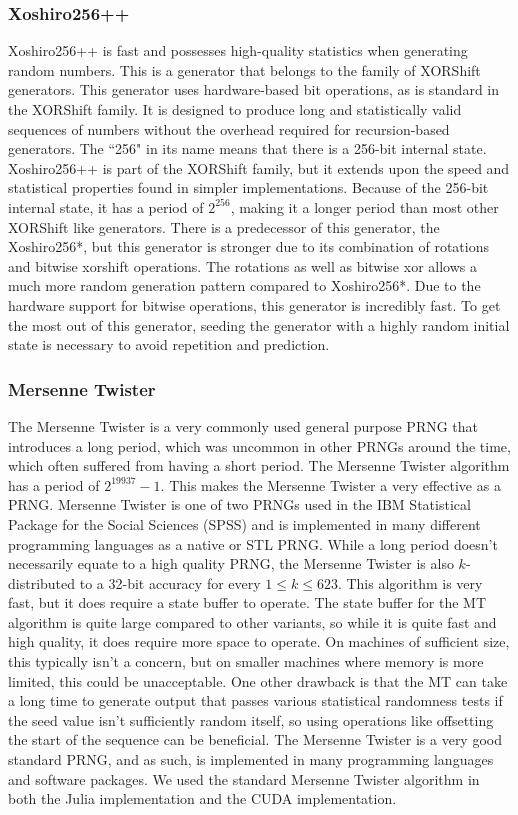 \documentclass{article}
\begin{document}
            \subsubsection{Xoshiro256++}
Xoshiro256++ is fast and possesses high-quality statistics when generating random numbers. This is a generator that belongs to the family of XORShift generators. This generator uses hardware-based bit operations, as is standard in the XORShift family. It is designed to produce long and statistically valid sequences of numbers without the overhead required for recursion-based generators. The ``256" in its name means that there is a 256-bit internal state. Xoshiro256++ is part of the XORShift family, but it extends upon the speed and statistical properties found in simpler implementations. Because of the 256-bit internal state, it has a period of $2^{256}$, making it a longer period than most other XORShift like generators. There is a predecessor of this generator, the Xoshiro256*, but this generator is stronger due to its combination of rotations and bitwise xorshift operations. The rotations as well as bitwise xor allows a much more random generation pattern compared to Xoshiro256*. Due to the hardware support for bitwise operations, this generator is incredibly fast. To get the most out of this generator, seeding the generator with a highly random initial state is necessary to avoid repetition and prediction.


            \subsubsection{Mersenne Twister} 
The Mersenne Twister is a very commonly used general purpose PRNG that introduces a long period, which was uncommon in other PRNGs around the time, which often suffered from having a short period. The Mersenne Twister algorithm has a period of $2^{19937}-1$. This makes the Mersenne Twister a very effective as a PRNG. Mersenne Twister is one of two PRNGs used in the IBM Statistical Package for the Social Sciences (SPSS) and is implemented in many different programming languages as a native or STL PRNG. While a long period doesn't necessarily equate to a high quality PRNG, the Mersenne Twister is also $k$-distributed to a 32-bit accuracy for every $1\leq k\leq623$. This algorithm is very fast, but it does require a state buffer to operate. The state buffer for the MT algorithm is quite large compared to other variants, so while it is quite fast and high quality, it does require more space to operate. On machines of sufficient size, this typically isn't a concern, but on smaller machines where memory is more limited, this could be unacceptable. One other drawback is that the MT can take a long time to generate output that passes various statistical randomness tests if the seed value isn't sufficiently random itself, so using operations like offsetting the start of the sequence can be beneficial. The Mersenne Twister is a very good standard PRNG, and as such, is implemented in many programming languages and software packages. We used the standard Mersenne Twister algorithm in both the Julia implementation and the CUDA implementation.
\end{document}
